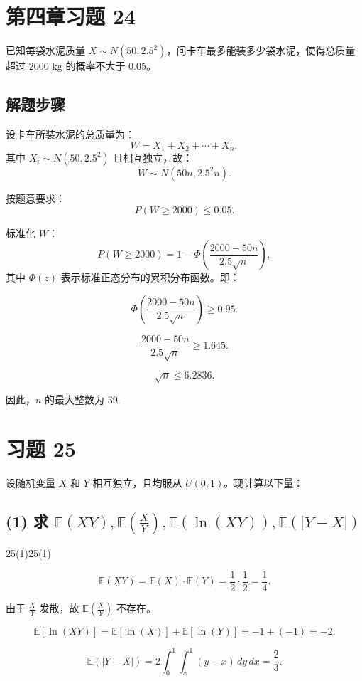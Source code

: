 \documentclass[twoside]{article}
\begin{document}
\section{第四章习题 24}

\begin{ans}{24}{24}
    已知每袋水泥质量 \( X \sim N(50, 2.5^2) \)，问卡车最多能装多少袋水泥，使得总质量超过 2000 kg 的概率不大于 0.05。

    \subsection*{解题步骤}
    
    设卡车所装水泥的总质量为：
    \[
    W = X_1 + X_2 + \cdots + X_n,
    \]
    其中 \( X_i \sim N(50, 2.5^2) \) 且相互独立，故：
    \[
    W \sim N(50n, 2.5^2 n).
    \]
    
    按题意要求：
    \[
    P(W \geq 2000) \leq 0.05.
    \]
    
    标准化 \( W \)：
    \[
    P(W \geq 2000) = 1 - \Phi \left( \frac{2000 - 50n}{2.5\sqrt{n}} \right),
    \]
    其中 \(\Phi(z)\) 表示标准正态分布的累积分布函数。即：

    \[
    \Phi \left( \frac{2000 - 50n}{2.5\sqrt{n}} \right) \geq 0.95.
    \]
    
    \[
    \frac{2000 - 50n}{2.5\sqrt{n}} \geq 1.645.
    \]

    \[
    \sqrt{n} \leq 6.2836.
    \]
    
    因此，\( n \) 的最大整数为 39.
    
\end{ans}

\section{习题 25}
设随机变量 \( X \) 和 \( Y \) 相互独立，且均服从 \( U(0,1) \)。现计算以下量：

\subsection*{(1) 求 \( \mathbb{E}(XY), \mathbb{E}(\frac{X}{Y}), \mathbb{E}(\ln(XY)), \mathbb{E}(|Y - X|) \)}

\begin{ans}{25(1)}{25(1)}

\[
\mathbb{E}(XY) = \mathbb{E}(X) \cdot \mathbb{E}(Y) = \frac{1}{2} \cdot \frac{1}{2} = \frac{1}{4}.
\]


由于 \( \frac{X}{Y} \) 发散，故 \( \mathbb{E}(\frac{X}{Y}) \) 不存在。

\[
\mathbb{E}[\ln(XY)] = \mathbb{E}[\ln(X)] + \mathbb{E}[\ln(Y)] = -1 + (-1) = -2.
\]

\[
\mathbb{E}(|Y - X|) = 2 \int_{0}^{1} \int_{x}^{1} (y - x) \, dy \, dx = \frac{2}{3}.
\]

\end{ans}
\end{document}
